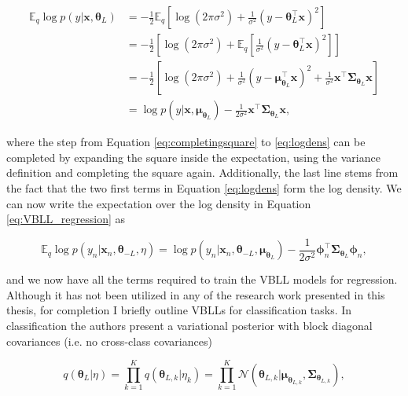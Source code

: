 \begin{align}
    \mathbb{E}_q\log p(y|\mathbf{x}, \bm\theta_L) & = -\frac{1}{2}\mathbb{E}_q\left[\log(2\pi\sigma^2)+\frac{1}{\sigma^2}(y-\bm{\theta}_L^\top\mathbf{x})^2\right] \\
    & = -\frac{1}{2}\left[\log(2\pi\sigma^2)+\mathbb{E}_q\left[\frac{1}{\sigma^2}(y-\bm{\theta}_L^\top\mathbf{x})^2\right]\right] \label{eq:completingsquare} \\
    & = -\frac{1}{2}\left[\log(2\pi\sigma^2)+\frac{1}{\sigma^2}(y-\bm\mu^\top_{\bm{\theta}_L} \mathbf{x})^2+\frac{1}{\sigma^2}\mathbf{x}^\top\bm\Sigma_{\bm{\theta}_L}\mathbf{x}\right] \label{eq:logdens} \\
    & = \log p(y|\mathbf{x}, \bm\mu_{\bm{\theta}_L})-\frac{1}{2\sigma^2}\mathbf{x}^\top\bm\Sigma_{\bm{\theta}_L}\mathbf{x},
\end{align}

\noindent where the step from Equation \ref{eq:completingsquare} to \ref{eq:logdens} can be completed by expanding the square inside the expectation, using the variance definition and completing the square again. Additionally, the last line stems from the fact that the two first terms in Equation \ref{eq:logdens} form the log density. We can now write the expectation over the log density in Equation \ref{eq:VBLL_regression} as

\begin{equation}
    \mathbb{E}_q\log p(y_n|\mathbf{x}_n, \bm{\theta}_{-L}, \eta) = \log p(y_n|\mathbf{x}_n, \bm{\theta}_{-L}, \bm\mu_{\bm{\theta}_{L}})-\frac{1}{2\sigma^2}\bm\phi_n^\top\bm\Sigma_{\bm{\theta}_{L}}\bm\phi_n,
\end{equation}

\noindent and we now have all the terms required to train the VBLL models for regression. \\


\noindent Although it has not been utilized in any of the research work presented in this thesis, for completion I briefly outline VBLLs for classification tasks. In classification the authors present a variational posterior with block diagonal covariances (i.e. no cross-class covariances)

\begin{equation}
    q(\bm{\theta}_L|\eta)=\prod^K_{k=1}q(\bm{\theta}_{L, k}|\eta_k)=\prod^K_{k=1}\mathcal{N}(\bm{\theta}_{L, k}|\bm\mu_{\bm{\theta}_{L, k}}, \bm\Sigma_{\bm{\theta}_{L, k}}),
\end{equation}

